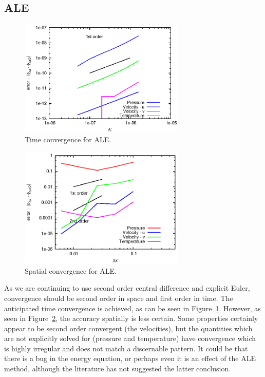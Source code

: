 \documentclass{article}
\begin{document}
\subsection{ALE}

\begin{figure}
    \centering
    \includegraphics[width=0.7\textwidth]{timeconvALE.eps}         
    \caption{Time convergence for ALE.}
    \label{fig:timeconvALE}
  \end{figure}
\begin{figure}
    \centering
    \includegraphics[width=0.7\textwidth]{spaceconvALE.eps}         
    \caption{Spatial convergence for ALE.}
    \label{fig:spaceconvALE}
  \end{figure}
As we are continuing to use second order central difference and explicit Euler, convergence should be second order in space and first order in time.  The anticipated time convergence is achieved, as can be seen in Figure~\ref{fig:timeconvALE}.  However, as seen in Figure~\ref{fig:spaceconvALE}, the accuracy spatially is less certain.  Some properties certainly appear to be second order convergent (the velocities), but the quantities which are not explicitly solved for (pressure and temperature) have convergence which is highly irregular and does not match a discernable pattern.  It could be that there is a bug in the energy equation, or perhaps even it is an effect of the ALE method, although the literature has not suggested the latter conclusion.
\end{document}
